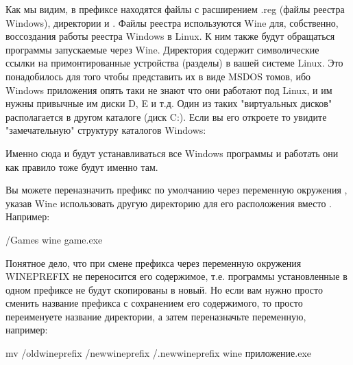\documentclass[letterpaper,10pt,russian,openany]{sphinxmanual}
\begin{document}
\sphinxAtStartPar
Как мы видим, в префиксе находятся файлы с расширением .reg (файлы реестра Windows), директории  и .
Файлы реестра используются Wine для, собственно, воссоздания работы реестра Windows в Linux.
К ним также будут обращаться программы запускаемые через Wine.
Директория  содержит символические ссылки на примонтированные устройства (разделы) в вашей системе Linux.
Это понадобилось для того чтобы представить их в виде MS\sphinxhyphen{}DOS томов,
ибо Windows приложения опять таки не знают что они работают под Linux, и им нужны привычные им диски D, E и т.д.
Один из таких "виртуальных дисков" располагается в другом каталоге \sphinxhyphen{}  (диск C:).
Если вы его откроете то увидите "замечательную" структуру каталогов Windows:

\noindent{}

\sphinxAtStartPar
Именно сюда и будут устанавливаться все Windows программы и работать они как правило тоже будут именно там.

\sphinxAtStartPar
Вы можете переназначить префикс по умолчанию через переменную окружения ,
указав Wine использовать другую директорию для его расположения вместо . Например:

\begin{sphinxVerbatim}[commandchars=\\\{\}]
\PYGZti{}/Games wine game.exe 
\end{sphinxVerbatim}

\sphinxAtStartPar
Понятное дело, что при смене префикса через переменную окружения WINEPREFIX не переносится его содержимое,
т.е. программы установленные в одном префиксе не будут скопированы в новый.
Но если вам нужно просто сменить название префикса с сохранением его содержимого,
то просто переименуете название директории, а затем переназначьте переменную, например:

\begin{sphinxVerbatim}[commandchars=\\\{\}]
mv \PYGZti{}/old\PYGZus{}wineprefix \PYGZti{}/new\PYGZus{}wineprefix
\PYGZti{}/.new\PYGZus{}wineprefix wine приложение.exe
\end{sphinxVerbatim}
\end{document}
